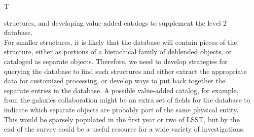 \begin{tasklist}{T}
\begin{task}
{structures, and developing value-added catalogs to supplement the level 2 database.\\
For smaller structures, it is likely that the database will contain pieces 
of the structure, either as portions of a hierachical
family of deblended objects, or cataloged as separate objects. Therefore, we need to 
develop strategies for querying the database to find such structures and either extract
the appropriate data for customized processing, or develop ways to put back together
the separate entries in the database. A possible value-added catalog, for example, from
the galaxies collaboration might be an extra set of fields for the database to indicate 
which separate objects are probably part of the same physical entity. This would
be sparsely populated in the first year or two of LSST, but by the end of the survey 
could be a useful resource for a wide variety of investigations.
}


\end{task}


\end{tasklist}
